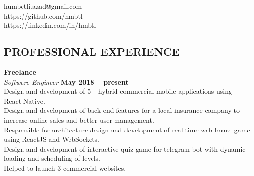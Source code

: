 \documentclass[margin,line]{resume}
\begin{document}
{
    \hfill humbetli.azad@gmail.com       \vspace{0mm}\\\vspace{0mm}%
    \hfill https://github.com/hmbtl \vspace{0mm}\\\vspace{-9mm}%
    \hfill https://linkedin.com/in/hmbtl           \vspace{0mm}\\\vspace{0mm}%
}

\begin{resume}

    \vspace{-3mm}



    \section{\mysidestyle \textbf{\large{P}\small{ROFESSIONAL} \large{E}\small{XPERIENCE}}}

    \textbf{\listing Freelance} \vspace{2mm}\\\vspace{1mm}%
    \textsl{Software Engineer} \hfill \textbf{May 2018 -- present}\\
    Design and development of 5+ hybrid commercial mobile applications using React-Native.\\
    Design and development of back-end features for a local insurance company to increase online sales and better user management.\\
    Responsible for architecture design and development of real-time web board game using ReactJS and WebSockets.\\
    Design and development of interactive quiz game for telegram bot with dynamic loading and scheduling of levels.\\
    Helped to launch 3 commercial websites.\\
   


\end{resume}
\end{document}
